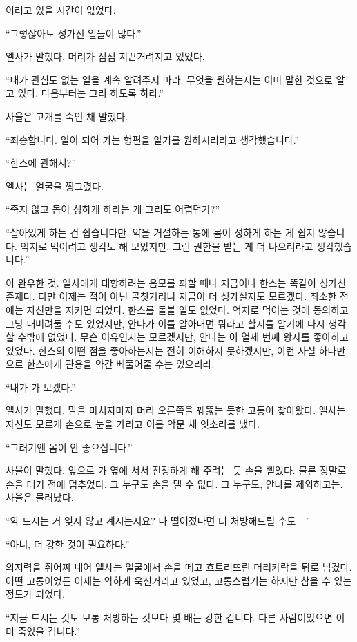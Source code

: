 이러고 있을 시간이 없었다.

``그렇잖아도 성가신 일들이 많다.''

엘사가 말했다. 머리가 점점 지끈거려지고 있었다.

``내가 관심도 없는 일을 계속 알려주지 마라. 무엇을 원하는지는 이미 말한 것으로 알고 있다. 다음부터는 그리 하도록 하라.''

사울은 고개를 숙인 채 말했다.

``죄송합니다. 일이 되어 가는 형편을 알기를 원하시리라고 생각했습니다.''

``한스에 관해서?''

엘사는 얼굴을 찡그렸다.

``죽지 않고 몸이 성하게 하라는 게 그리도 어렵던가?''

``살아있게 하는 건 쉽습니다만, 약을 거절하는 통에 몸이 성하게 하는 게 쉽지 않습니다. 억지로 먹이려고 생각도 해 보았지만, 그런 권한을 받는 게 더 나으리라고 생각했습니다.''

이 완우한 것. 엘사에게 대항하려는 음모를 꾀할 때나 지금이나 한스는 똑같이 성가신 존재다. 다만 이제는 적이 아닌 골칫거리니 지금이 더 성가실지도 모르겠다. 최소한 전에는 자신만을 지키면 되었다. 한스를 돌볼 일도 없었다. 억지로 먹이는 것에 동의하고 그냥 내버려둘 수도 있었지만, 안나가 이를 알아내면 뭐라고 할지를 알기에 다시 생각할 수밖에 없었다. 무슨 이유인지는 모르겠지만, 안나는 이 열세 번째 왕자를 좋아하고 있었다. 한스의 어떤 점을 좋아하는지는 전혀 이해하지 못하겠지만, 이런 사실 하나만으로 한스에게 관용을 약간 베풀어줄 수는 있으리라.

``내가 가 보겠다.''

엘사가 말했다. 말을 마치자마자 머리 오른쪽을 꿰뚫는 듯한 고통이 찾아왔다. 엘사는 자신도 모르게 손으로 눈을 가리고 이를 악문 채 잇소리를 냈다.

``그러기엔 몸이 안 좋으십니다.''

사울이 말했다. 앞으로 가 옆에 서서 진정하게 해 주려는 듯 손을 뻗었다. 물론 정말로 손을 대기 전에 멈추었다. 그 누구도 손을 댈 수 없다. 그 누구도, 안나를 제외하고는. 사울은 물러났다.

``약 드시는 거 잊지 않고 계시는지요? 다 떨어졌다면 더 처방해드릴 수도—''

``아니, 더 강한 것이 필요하다.''

의지력을 쥐어짜 내어 엘사는 얼굴에서 손을 떼고 흐트러뜨린 머리카락을 뒤로 넘겼다. 어떤 고통이었든 이제는 약하게 욱신거리고 있었고, 고통스럽기는 하지만 참을 수 있는 정도가 되었다.

``지금 드시는 것도 보통 처방하는 것보다 몇 배는 강한 겁니다. 다른 사람이었으면 이미 죽었을 겁니다.''

